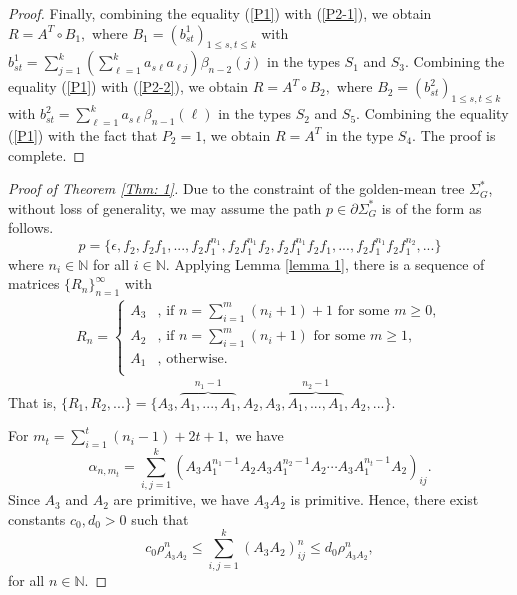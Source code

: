 \documentclass{amsart}
\theoremstyle{definition}
\begin{document}
\begin{proof}
Finally, combining the equality (\ref{P1}) with (\ref{P2-1}), we obtain $R=A^T\circ B_1,$ where $B_1=(b_{st}^1)_{1\leq s,t\leq k}$ with $b_{st}^1=\sum_{j=1}^k(\sum_{\ell=1}^k a_{s\ell}a_{\ell j})\beta_{n-2}(j)$ in the types $S_1$ and $S_3.$ Combining the equality (\ref{P1}) with (\ref{P2-2}), we obtain $R=A^T\circ B_2,$ where $B_2=(b_{st}^2)_{1\leq s,t\leq k}$ with $b_{st}^2=\sum_{\ell=1}^k a_{s\ell}\beta_{n-1}(\ell)$ in the types $S_2$ and $S_5.$ Combining the equality (\ref{P1}) with the fact that $P_2=1$, we obtain $R=A^T$ in the type $S_4.$ The proof is complete. 
\end{proof}



\begin{proof}[Proof of Theorem \ref{Thm: 1}] Due to the constraint of the golden-mean tree $\Sigma_G^*$, without loss of generality, we may assume the path $p\in\partial \Sigma_G^*$ is of the form as follows.  
$$p=\{\epsilon , f_2,f_2f_1,... ,f_2f_1^{n_1}, f_2f_1^{n_1}f_2, f_2f_1^{n_1}f_2f_1,...,f_2f_1^{n_1}f_2f_1^{n_2},...\}$$
where $n_i\in\mathbb{N}$ for all $i\in\mathbb{N}.$ Applying Lemma \ref{lemma 1}, there is a sequence of matrices $\{R_n\}_{n=1}^\infty$ with
\begin{align*}
    R_n=\left\{\begin{array}{ll}
        A_3& \mbox{, if }n=\sum_{i=1}^m (n_i+1)+1 \mbox{ for some }m\geq 0,     \\
        A_2&  \mbox{, if }n=\sum_{i=1}^m (n_i+1) \mbox{ for some }m\geq 1,   \\
        A_1&   \mbox{, otherwise.}  \\
    \end{array}\right.
\end{align*}
That is, $\{R_1,R_2,...\}=\{A_3,\overbrace{A_1,..., A_1}^{n_1-1},A_2,A_3,\overbrace{A_1,..., A_1}^{n_2-1},A_2,...\}$.


For $m_t=\sum_{i=1}^t (n_i-1)+2t+1,$ we have
$$\alpha_{n,m_t}=\sum_{i,j=1}^k(A_3A_1^{n_1-1}A_2A_3A_1^{n_2-1}A_2\cdots A_3A_1^{n_t-1}A_2)_{ij}.$$
Since $A_3$ and $A_2$ are primitive, we have $A_3A_2$ is primitive. Hence, there exist constants $c_0,d_0>0$ such that 
\[c_0\rho_{A_3A_2}^n\leq \sum_{i,j=1}^k(A_3A_2)^n_{ij}\leq d_0\rho_{A_3A_2}^n,\]
for all $n\in\mathbb{N}$. 


\end{proof}
\end{document}
